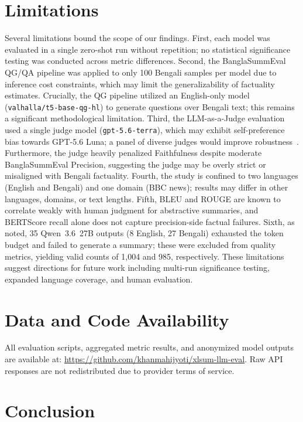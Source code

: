 \documentclass[runningheads]{llncs}
\begin{document}
\section{Limitations}\label{sec:limitations}

Several limitations bound the scope of our findings. First, each model was evaluated in a single zero-shot run without repetition; no statistical significance testing was conducted across metric differences. Second, the BanglaSummEval QG/QA pipeline was applied to only 100 Bengali samples per model due to inference cost constraints, which may limit the generalizability of factuality estimates. Crucially, the QG pipeline utilized an English-only model (\texttt{valhalla/t5-base-qg-hl}) to generate questions over Bengali text; this remains a significant methodological limitation. Third, the LLM-as-a-Judge evaluation used a single judge model (\texttt{gpt-5.6-terra}), which may exhibit self-preference bias towards GPT-5.6 Luna; a panel of diverse judges would improve robustness~\cite{verga2024}. Furthermore, the judge heavily penalized Faithfulness despite moderate BanglaSummEval Precision, suggesting the judge may be overly strict or misaligned with Bengali factuality. Fourth, the study is confined to two languages (English and Bengali) and one domain (BBC news); results may differ in other languages, domains, or text lengths. Fifth, BLEU and ROUGE are known to correlate weakly with human judgment for abstractive summaries, and BERTScore recall alone does not capture precision-side factual failures. Sixth, as noted, 35 Qwen~3.6~27B outputs (8 English, 27 Bengali) exhausted the token budget and failed to generate a summary; these were excluded from quality metrics, yielding valid counts of 1,004 and 985, respectively. These limitations suggest directions for future work including multi-run significance testing, expanded language coverage, and human evaluation.

\section{Data and Code Availability}\label{sec:availability}

All evaluation scripts, aggregated metric results, and anonymized model outputs are available at: \url{https://github.com/khanmahijyoti/xlsum-llm-eval}. Raw API responses are not redistributed due to provider terms of service.

\section{Conclusion}\label{sec:conclusions}
\end{document}
